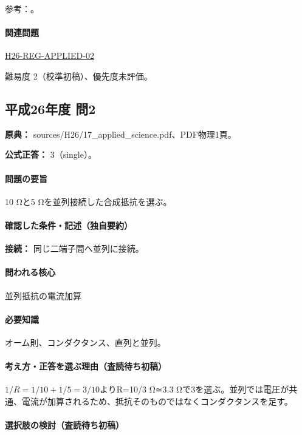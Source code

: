 \par 参考：\cite{mit_em07}。

\paragraph{関連問題} \hyperref[q:h26-reg-applied-02]{H26-REG-APPLIED-02}

\par 難易度 2（校準初稿）、優先度未評価。

\subsection{平成26年度 問2}
\label{q:h26-reg-applied-02}

\noindent\textbf{原典：} sources/H26/17\_applied\_science.pdf、PDF物理1頁。

\textbf{公式正答：} 3（single）。

\paragraph{問題の要旨} 10 Ωと5 Ωを並列接続した合成抵抗を選ぶ。

\paragraph{確認した条件・記述（独自要約）}\mbox{}\par

\noindent\textbf{接続：} 同じ二端子間へ並列に接続。\par

\paragraph{問われる核心} 並列抵抗の電流加算

\paragraph{必要知識} オーム則、コンダクタンス、直列と並列。

\paragraph{考え方・正答を選ぶ理由（査読待ち初稿）} \(1/R=1/10+1/5=3/10\)よりR=\allowbreak{}10/3 Ω≃3.3 Ωで3を選ぶ。並列では電圧が共通、電流が加算されるため、抵抗そのものではなくコンダクタンスを足す。

\paragraph{選択肢の検討（査読待ち初稿）}\mbox{}\par

